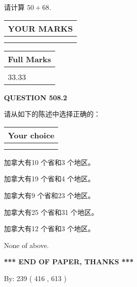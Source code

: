 \documentclass{ctexart}
\begin{document}
  
 
请计算 $ %
50 +  %
68 $.
 

 

 
  
\vspace{0.2in}
  
\noindent\begin{tabular}{|l|}
\hline
 YOUR MARKS  \\
\hline
 \\ 
 \\ 
\hline
\end{tabular}
\hspace{0.05in} \begin{tabular}{|l|}
\hline
 Full Marks  \\
\hline
 \\ 
33.33 \\
\hline
\end{tabular}
{\textbf{\Large{QUESTION
508.2 
}}}
  
  
请从如下的陈述中选择正确的：
  
  
\noindent\hspace{3.0in} \begin{tabular}{|l|}
\hline
Your choice \\
\hline
 \\ 
 \\ 
\hline
\end{tabular}
  
  
 
 
加拿大有10 个省和3 个地区。
 
 
加拿大有19 个省和4 个地区。
 
 
加拿大有9 个省和23 个地区。
 
 
加拿大有25 个省和31 个地区。
 
 
加拿大有12 个省和3 个地区。
 
 
 None of above.
 
 
   
   
 \vspace{0.2in}
 
   
   
   
   
\vspace{1.0in} 
{\textbf{\large{ *** END OF PAPER, THANKS *** }}} 
   
   
\hspace{1.0in} By: 
 239 ( 416 ,  613 )
   
\end{document}

